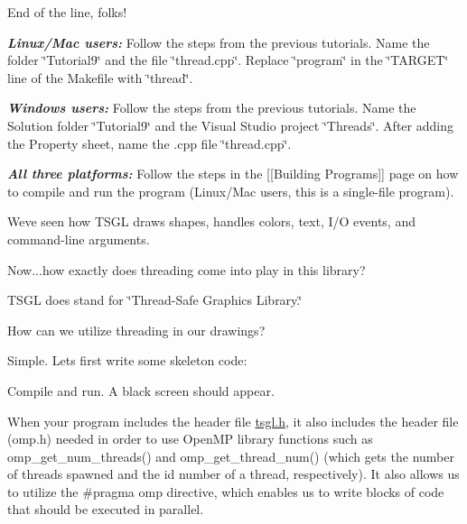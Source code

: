 End of the line, folks!

{\itshape {\bfseries{Linux/\+Mac users\+:}}} Follow the steps from the previous tutorials. Name the folder \char`\"{}\+Tutorial9\char`\"{} and the file \char`\"{}thread.\+cpp\char`\"{}. Replace \char`\"{}program\char`\"{} in the \char`\"{}\+T\+A\+R\+G\+E\+T\char`\"{} line of the Makefile with \char`\"{}thread\char`\"{}.

{\itshape {\bfseries{Windows users\+:}}} Follow the steps from the previous tutorials. Name the Solution folder \char`\"{}\+Tutorial9\char`\"{} and the Visual Studio project \char`\"{}\+Threads\char`\"{}. After adding the Property sheet, name the .cpp file \char`\"{}thread.\+cpp\char`\"{}.

{\itshape {\bfseries{All three platforms\+:}}} Follow the steps in the \mbox{[}\mbox{[}Building Programs\mbox{]}\mbox{]} page on how to compile and run the program (Linux/\+Mac users, this is a single-\/file program).

We\textquotesingle{}ve seen how T\+S\+GL draws shapes, handles colors, text, I/O events, and command-\/line arguments.

Now...how exactly does threading come into play in this library?

T\+S\+GL does stand for \char`\"{}\+Thread-\/\+Safe Graphics Library.\char`\"{}

How can we utilize threading in our drawings?

Simple. Let\textquotesingle{}s first write some skeleton code\+:


\begin{DoxyCode}{0}
\DoxyCodeLine{\textcolor{preprocessor}{\#include <tsgl.h>}}
\DoxyCodeLine{}
\DoxyCodeLine{\}}
\end{DoxyCode}


Compile and run. A black screen should appear.

When your program includes the header file {\ttfamily \mbox{\hyperlink{tsgl_8h_source}{tsgl.\+h}}}, it also includes the header file ({\ttfamily omp.\+h}) needed in order to use Open\+MP library functions such as {\ttfamily omp\+\_\+get\+\_\+num\+\_\+threads()} and {\ttfamily omp\+\_\+get\+\_\+thread\+\_\+num()} (which gets the number of threads spawned and the id number of a thread, respectively). It also allows us to utilize the {\ttfamily \#pragma omp} directive, which enables us to write blocks of code that should be executed in parallel.


